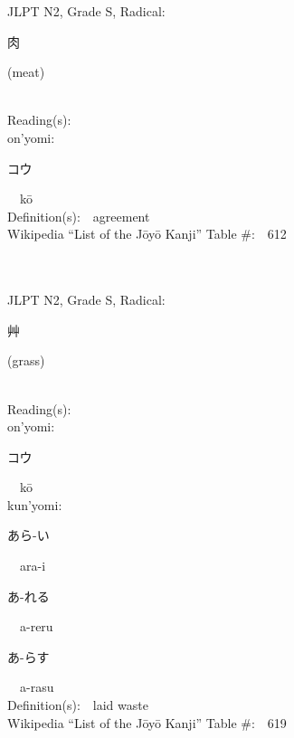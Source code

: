 \begin{multicols}{2}
{JLPT N2, Grade S, Radical:\ \ {\begin{CJK}{UTF8}{min} 肉 \end{CJK}} (meat) } \\
Reading(s):\ \ \\
{\hspace*{1em}}on'yomi:\ \ \\
{\hspace*{2em}}{\begin{CJK}{UTF8}{min} コウ \end{CJK}}\ \ k\=o\ \ \\
Definition(s):\ \ agreement \\
Wikipedia ``List of the J\=oy\=o Kanji'' Table \#:\ \ 612 \\
\ \ \\
{\fontsize{34pt}{40pt}  }\ \ \\  %
{JLPT N2, Grade S, Radical:\ \ {\begin{CJK}{UTF8}{min} 艸 \end{CJK}} (grass) } \\
Reading(s):\ \ \\
{\hspace*{1em}}on'yomi:\ \ \\
{\hspace*{2em}}{\begin{CJK}{UTF8}{min} コウ \end{CJK}}\ \ k\=o\ \ \\
{\hspace*{1em}}kun'yomi:\ \ \\
{\hspace*{2em}}{\begin{CJK}{UTF8}{min} あら-い \end{CJK}}\ \ ara-i\ \ \\
{\hspace*{2em}}{\begin{CJK}{UTF8}{min} あ-れる \end{CJK}}\ \ a-reru\ \ \\
{\hspace*{2em}}{\begin{CJK}{UTF8}{min} あ-らす \end{CJK}}\ \ a-rasu\ \ \\
Definition(s):\ \ laid waste \\
Wikipedia ``List of the J\=oy\=o Kanji'' Table \#:\ \ 619 \\

\end{multicols}
